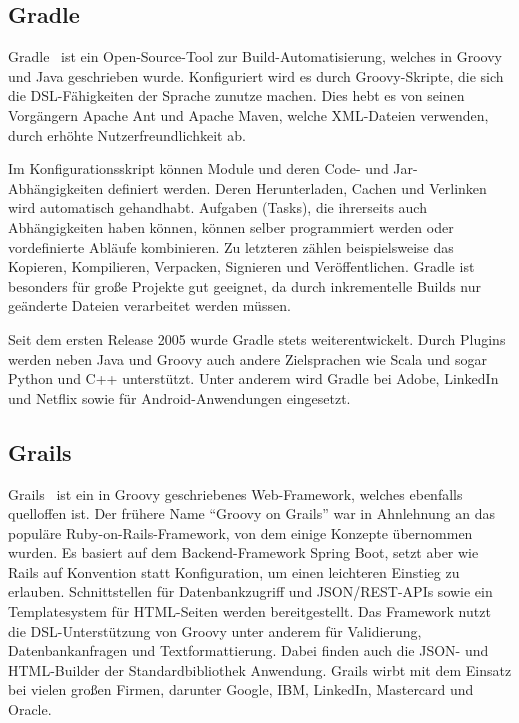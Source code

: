 \documentclass[a4paper]{article}
\begin{document}
\subsection{Gradle}\label{subsec:gradle}

Gradle~\cite{gradle} ist ein Open-Source-Tool zur Build-Automatisierung, welches in Groovy und Java geschrieben wurde.
Konfiguriert wird es durch Groovy-Skripte, die sich die DSL-Fähigkeiten der Sprache zunutze machen.
Dies hebt es von seinen Vorgängern Apache Ant und Apache Maven, welche XML-Dateien verwenden, durch erhöhte Nutzerfreundlichkeit ab.

Im Konfigurationsskript können Module und deren Code- und Jar-Abhängigkeiten definiert werden.
Deren Herunterladen, Cachen und Verlinken wird automatisch gehandhabt.
Aufgaben (Tasks), die ihrerseits auch Abhängigkeiten haben können, können selber programmiert werden oder vordefinierte Abläufe kombinieren.
Zu letzteren zählen beispielsweise das Kopieren, Kompilieren, Verpacken, Signieren und Veröffentlichen.
Gradle ist besonders für große Projekte gut geeignet, da durch inkrementelle Builds nur geänderte Dateien verarbeitet werden müssen.

Seit dem ersten Release 2005 wurde Gradle stets weiterentwickelt.
Durch Plugins werden neben Java und Groovy auch andere Zielsprachen wie Scala und sogar Python und C++ unterstützt.
Unter anderem wird Gradle bei Adobe, LinkedIn und Netflix sowie für Android-Anwendungen eingesetzt.

\subsection{Grails}\label{subsec:grails}

Grails~\cite{grails} ist ein in Groovy geschriebenes Web-Framework, welches ebenfalls quelloffen ist.
Der frühere Name ``Groovy on Grails'' war in Ahnlehnung an das populäre Ruby-on-Rails-Framework, von dem einige Konzepte übernommen wurden.
Es basiert auf dem Backend-Framework Spring Boot, setzt aber wie Rails auf Konvention statt Konfiguration, um einen leichteren Einstieg zu erlauben.
Schnittstellen für Datenbankzugriff und JSON/REST-APIs sowie ein Templatesystem für HTML-Seiten werden bereitgestellt.
Das Framework nutzt die DSL-Unterstützung von Groovy unter anderem für Validierung, Datenbankanfragen und Textformattierung.
Dabei finden auch die JSON- und HTML-Builder der Standardbibliothek Anwendung.
Grails wirbt mit dem Einsatz bei vielen großen Firmen, darunter Google, IBM, LinkedIn, Mastercard und Oracle.
\end{document}
